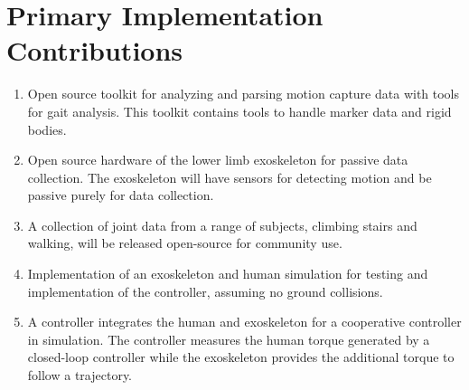 \section{Primary Implementation Contributions}
\begin{enumerate}[wide, nosep, labelindent = 0pt, topsep = 1ex]
    \item Open source toolkit for analyzing and parsing motion capture data with tools for gait analysis. This toolkit contains tools to handle marker data and rigid bodies.  
    \item Open source hardware of the lower limb exoskeleton for passive data collection. The exoskeleton will have sensors for detecting motion and be passive purely for data collection.
    \item A collection of joint data from a range of subjects, climbing stairs and walking, will be released open-source for community use.  
    \item  Implementation of an exoskeleton and human simulation for testing and implementation of the controller, assuming no ground collisions.
    \item A controller integrates the human and exoskeleton for a cooperative controller in simulation. The controller measures the human torque generated by a closed-loop controller while the exoskeleton provides the additional torque to follow a trajectory.  

\end{enumerate}